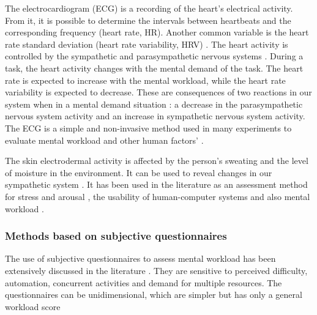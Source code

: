        The electrocardiogram (ECG) is a recording of the heart’s electrical activity. From it, it is possible to determine the intervals between heartbeats and the corresponding frequency (heart rate, HR). Another common variable is the heart rate standard deviation (heart rate variability, HRV) \cite{cain2007review}. The heart activity is controlled by the sympathetic and parasympathetic nervous systems \cite{stanton2004handbook}. During a task, the heart activity changes with the mental demand of the task. The heart rate is expected to increase with the mental workload, while the heart rate variability is expected to decrease. These are consequences of two reactions in our system when in a mental demand situation \cite{stanton2004handbook}: a decrease in the parasympathetic nervous system activity and an increase in sympathetic nervous system activity. The ECG is a simple and non-invasive method used in many experiments to evaluate mental workload and other human factors’ \cite{mohanavelu2020cognitive, mansikka2016fighter, zhang2014detection}.
                
         The skin electrodermal activity is affected by the person’s sweating and the level of moisture in the environment. It can be used to reveal changes in our sympathetic system \cite{nourbakhsh2012using, shi2007galvanic}. It has been used in the literature as an assessment method for stress and arousal \cite{nourbakhsh2012using, stanton2004handbook, shi2007galvanic}, the usability of human-computer systems \cite{shi2007galvanic} and also mental workload \cite{zhang2014detection, borghini2014measuring}.
    
    \subsubsection*{Methods based on subjective questionnaires}

        The use of subjective questionnaires to assess mental workload has been extensively discussed in the literature \cite{sanders1998human, stanton2004handbook}. They are sensitive to perceived difficulty, automation, concurrent activities and demand for multiple resources. The questionnaires can be unidimensional, which are simpler but has only a general workload score 

